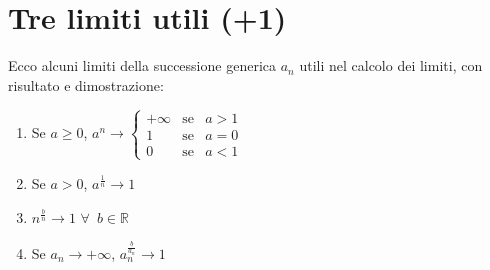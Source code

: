 \documentclass{article}
\theoremstyle{definition}
\begin{document}
\section{Tre limiti utili (+1)}
Ecco alcuni limiti della successione generica $a_n$ utili nel calcolo dei limiti, con risultato e dimostrazione:
\begin{enumerate}
    \item Se $a \geqslant 0$, $a^n \to \left\{\begin{array}{ccc}
      +\infty   & \mbox{se} & a>1\\
      1  & \mbox{se} & a=0\\
      0 & \mbox{se} & a<1
    \end{array}\right.$
    \item Se $a>0$, $a^{\frac{1}{n}}\longrightarrow1$
    \item $n^{\frac{b}{n}}\longrightarrow1$ $\forall \,\,\, b \in \mathbb{R}$
    \item Se $a_n \longrightarrow+\infty$, $a_n^{\frac{b}{a_n}}\longrightarrow1$
\end{enumerate}
\end{document}
